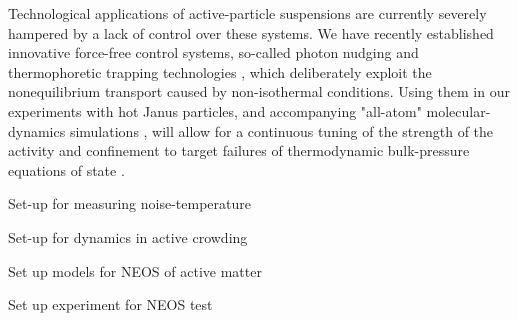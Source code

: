 \begin{workpackage}
\begin{tasklist}
\begin{task}[title=Active Brownian Particle Suspensions,id=task4,lead=ULEI,wphases=16-48]
Technological applications of active-particle suspensions  are
currently severely hampered by a lack of control over these systems.
%
We have recently established innovative force-free control systems, so-called photon nudging
and thermophoretic trapping technologies \cite{Qian2013,Braun:NanoLetters:2015}, which deliberately exploit 
the nonequilibrium transport caused by non-isothermal conditions.
%
Using them in our experiments with hot Janus particles, and accompanying "all-atom" molecular-dynamics 
simulations \cite{chakraborty-etal:2011}, will allow for a continuous tuning of the strength of 
the activity and confinement to target failures of thermodynamic bulk-pressure equations of
state \cite{ginot-etal:2015}.
\end{task}


\end{tasklist}

\printbibliography[heading=proposal-bib,env=proposal-env]

\begin{wpdelivs}
\begin{wpdeliv}[due=12,id=D2.3,dissem=PU,nature=R,lead=ULEI]
      {Set-up for measuring noise-temperature}
  \end{wpdeliv}
  \begin{wpdeliv}[due=24,id=D2.1,dissem=PU,nature=R,lead=ULEI]
      {Set-up for dynamics in active crowding}
  \end{wpdeliv}
  \begin{wpdeliv}[due=24,id=D2.2,dissem=PU,nature=R,lead=ULEI]
      {Set up models for NEOS of active matter}
\end{wpdeliv}
  \begin{wpdeliv}[due=36,id=D2.4,dissem=PU,nature=R,lead=ULEI]
      {Set up experiment for NEOS test}
\end{wpdeliv}
\end{wpdelivs}

\end{workpackage}
